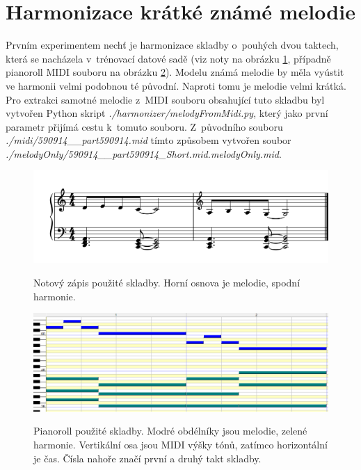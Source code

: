 \section{Harmonizace krátké známé melodie}
Prvním experimentem nechť je harmonizace skladby o~pouhých dvou taktech,
která se nacházela v~trénovací datové sadě 
(viz noty na obrázku \ref{obrazekNotyKratkeZname},
případně pianoroll MIDI souboru na obrázku \ref{obrazekPianoRollKratkeZname}).
Modelu známá melodie by měla vyústit ve harmonii velmi podobnou té původní.
Naproti tomu je melodie velmi krátká.
Pro extrakci samotné melodie z~MIDI souboru obsahující tuto skladbu 
byl vytvořen Python skript \emph{./harmonizer/melodyFromMidi.py}, 
který jako první parametr přijímá cestu k~tomuto souboru.
Z~původního souboru \emph{./midi/590914\_\_part590914.mid}
tímto způsobem vytvořen soubor 
\emph{./melodyOnly/590914\_\_part590914\_Short.mid.melodyOnly.mid}.

\begin{figure}[h]\centering
    \centering
    \includegraphics[width=0.8\linewidth]{obrazky/KratkaSkladbaKHarmonizaciNoty.png}\\[1pt]  
    \caption{Notový zápis použité skladby. Horní osnova je melodie, spodní harmonie.}    
    \label{obrazekNotyKratkeZname}
\end{figure}
\begin{figure}[h]\centering
    \centering
    \includegraphics[width=0.8\linewidth]{obrazky/KratkaSkladbaKHarmonizaciPianoRoll.png}\\[1pt]  
    \caption{Pianoroll použité skladby. Modré obdélníky jsou melodie, zelené harmonie.
    Vertikální osa jsou MIDI výšky tónů, zatímco horizontální je čas. 
    Čísla nahoře značí první a druhý takt skladby.}    
    \label{obrazekPianoRollKratkeZname}
\end{figure}

